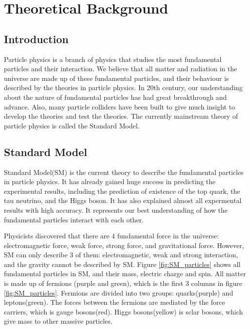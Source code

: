 \chapter{Theoretical Background}
\label{ch:theory}

\section{Introduction}
Particle physics is a branch of physics that studies the most fundamental particles and their interaction.
We believe that all matter and radiation in the universe are made up of these fundamental particles, and their behaviour is described by the theories in particle physics.
In 20th century, our understanding about the nature of fundamental particles has had great breakthrough and  advance.
Also, many particle colliders have been built to give much insight to develop the theories and test the theories.
The currently mainstream theory of particle physics is called the Standard Model.

\section{Standard Model}
\label{sec:Standard_Model}
Standard Model(SM) is the current theory to describe the fundamental particles in particle physics.
It has already gained huge success in predicting the experimental results, including the prediction of existence of the top quark, the tau neutrino, and the Higgs boson.
It has also explained almost all expermental results with high accuracy.
It represents our best understanding of how the fundamental particles interact with each other.

Physicists discovered that there are 4 fundamental force in the universe: electromagnetic force, weak force, strong force, and gravitational force.
However, SM can only describe 3 of them: electromagnetic, weak and strong interaction, and the gravity cannot be described by SM.
Figure \ref{fig:SM_particles} shows all fundamental particles in SM, and their mass, electric charge and spin.
All matter is made up of fermions (purple and green), which is the first 3 columns in figure \ref{fig:SM_particles}.
Fermions are divided into two groups: quarks(purple) and leptons(green).
The forces between the fermions are mediated by the force carriers, which is gauge bosons(red).
Higgs bosons(yellow) is sclar bosons, which give mass to other massive particles.


